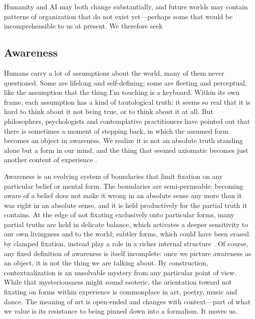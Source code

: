 \documentclass[11pt]{article}
\begin{document}
 
Humanity and AI may both change substantially, and future worlds may contain patterns of organization that do not exist yet---perhaps some that would be incomprehensible to us at present. We therefore seek


\subsection{Awareness} 

Humans carry a lot of assumptions about the world, many of them never questioned. Some are lifelong and self-defining; some are fleeting and perceptual, like the assumption that the thing I'm touching is a keyboard. Within its own frame, each assumption has a kind of tautological truth: it seems so real that it is hard to think about it not being true, or to think about it at all. But philosophers, psychologists and contemplative practitioners have pointed out that there is sometimes a moment of stepping back, in which the assumed form becomes an object in awareness. We realize it is not an absolute truth standing alone but a form in our mind, and the thing that seemed axiomatic becomes just another content of experience \citep{watts2011wisdom, kegan1982evolving}.

\citep{wegner1994ironic}

Awareness is an evolving system of boundaries that limit fixation on any particular belief or mental form. The boundaries are semi-permeable: becoming aware of a belief does not make it wrong in an absolute sense any more than it was right in an absolute sense, and it is held productively for the partial truth it contains. At the edge of not fixating exclusively onto particular forms, many partial truths are held in delicate balance, which activates a deeper sensitivity to our own livingness and to the world; subtler forms, which could have been erased by clamped fixation, instead play a role in a richer internal structure \citep{beisser1970paradoxical}. Of course, any fixed definition of awareness is itself incomplete: once we picture awareness as an object, it is not the thing we are talking about. By construction, contextualization is an unsolvable mystery from any particular point of view. While that mysteriousness might sound esoteric, the orientation toward not fixating on forms within experience is commonplace in art, poetry, music and dance. The meaning of art is open-ended and changes with context---part of what we value is its resistance to being pinned down into a formalism. It moves us.
\end{document}
